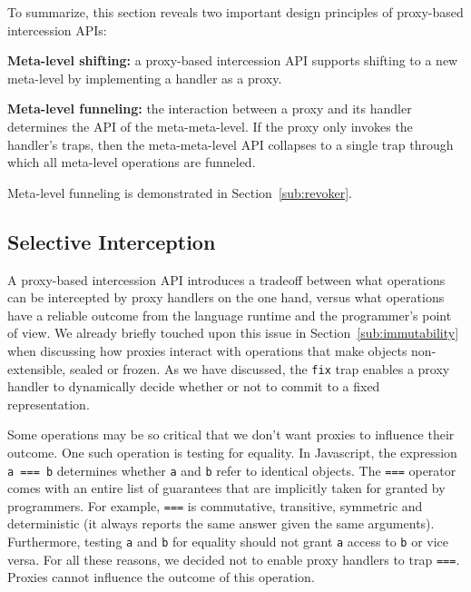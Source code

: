 \documentclass{sig-alternate}
\begin{document}
To summarize, this section reveals two important design principles of proxy-based intercession APIs:

\textbf{Meta-level shifting:} a proxy-based intercession API supports shifting to a new meta-level by implementing a handler as a proxy.

\textbf{Meta-level funneling:} the interaction between a proxy and its handler determines the API of the meta-meta-level. If the proxy only invokes the handler's traps, then the meta-meta-level API collapses to a single trap through which all meta-level operations are funneled.

Meta-level funneling is demonstrated in Section~\ref{sub:revoker}.



\subsection{Selective Interception}
\label{sub:selective}

A proxy-based intercession API introduces a tradeoff between what operations can be intercepted by proxy handlers on the one hand, versus what operations have a reliable outcome from the language runtime and the programmer's point of view. We already briefly touched upon this issue in Section~\ref{sub:immutability} when discussing how proxies interact with operations that make objects non-extensible, sealed or frozen. As we have discussed, the \texttt{fix} trap enables a proxy handler to dynamically decide whether or not to commit to a fixed representation.

Some operations may be so critical that we don't want proxies to influence their outcome. One such operation is testing for equality. In Javascript, the expression \texttt{a === b} determines whether \texttt{a} and \texttt{b} refer to identical objects. The \texttt{===} operator comes with an entire list of guarantees that are implicitly taken for granted by programmers. For example, \texttt{===} is commutative, transitive, symmetric and deterministic (it always reports the same answer given the same arguments). Furthermore, testing \texttt{a} and \texttt{b} for equality should not grant \texttt{a} access to \texttt{b} or vice versa. For all these reasons, we decided not to enable proxy handlers to trap \texttt{===}. Proxies cannot influence the outcome of this operation.
\end{document}

